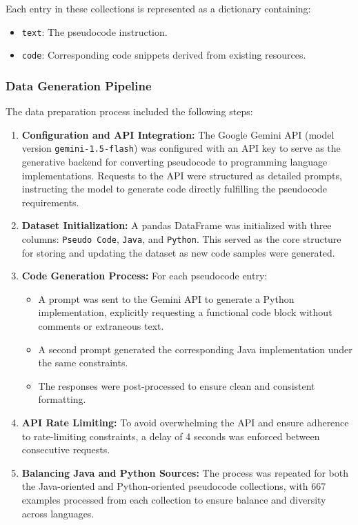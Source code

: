 \documentclass{dhbenelux}
\begin{document}
Each entry in these collections is represented as a dictionary containing:
\begin{itemize}
  \item \texttt{text}: The pseudocode instruction.
  \item \texttt{code}: Corresponding code snippets derived from existing resources.
\end{itemize}

\subsubsection{Data Generation Pipeline}
The data preparation process included the following steps:
\begin{enumerate}
  \item \textbf{Configuration and API Integration:} The Google Gemini API (model version \texttt{gemini-1.5-flash}) was configured with an API key to serve as the generative backend for converting pseudocode to programming language implementations. Requests to the API were structured as detailed prompts, instructing the model to generate code directly fulfilling the pseudocode requirements.
  \item \textbf{Dataset Initialization:} A pandas DataFrame was initialized with three columns: \texttt{Pseudo Code}, \texttt{Java}, and \texttt{Python}. This served as the core structure for storing and updating the dataset as new code samples were generated.
  \item \textbf{Code Generation Process:} For each pseudocode entry:
    \begin{itemize}
        \item A prompt was sent to the Gemini API to generate a Python implementation, explicitly requesting a functional code block without comments or extraneous text.
        \item A second prompt generated the corresponding Java implementation under the same constraints.
        \item The responses were post-processed to ensure clean and consistent formatting.
    \end{itemize}
  \item \textbf{API Rate Limiting:} To avoid overwhelming the API and ensure adherence to rate-limiting constraints, a delay of 4 seconds was enforced between consecutive requests.
  \item \textbf{Balancing Java and Python Sources:} The process was repeated for both the Java-oriented and Python-oriented pseudocode collections, with 667 examples processed from each collection to ensure balance and diversity across languages.
\end{enumerate}
\end{document}
